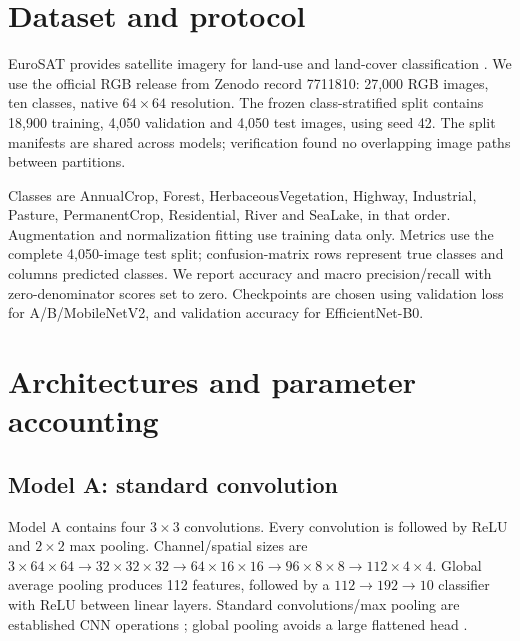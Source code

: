 \documentclass[11pt,a4paper]{article}
\begin{document}
\section{Dataset and protocol}
EuroSAT provides satellite imagery for land-use and land-cover classification \cite{helber}. We use the official RGB release from Zenodo record 7711810: 27,000 RGB images, ten classes, native $64\times64$ resolution. The frozen class-stratified split contains 18,900 training, 4,050 validation and 4,050 test images, using seed 42. The split manifests are shared across models; verification found no overlapping image paths between partitions.

Classes are AnnualCrop, Forest, HerbaceousVegetation, Highway, Industrial, Pasture, PermanentCrop, Residential, River and SeaLake, in that order. Augmentation and normalization fitting use training data only. Metrics use the complete 4,050-image test split; confusion-matrix rows represent true classes and columns predicted classes. We report accuracy and macro precision/recall with zero-denominator scores set to zero. Checkpoints are chosen using validation loss for A/B/MobileNetV2, and validation accuracy for EfficientNet-B0.

\section{Architectures and parameter accounting}
\subsection{Model A: standard convolution}
Model A contains four $3\times3$ convolutions. Every convolution is followed by ReLU and $2\times2$ max pooling. Channel/spatial sizes are
$3\times64\times64\rightarrow32\times32\times32\rightarrow64\times16\times16\rightarrow96\times8\times8\rightarrow112\times4\times4$.
Global average pooling produces 112 features, followed by a $112\rightarrow192\rightarrow10$ classifier with ReLU between linear layers. Standard convolutions/max pooling are established CNN operations \cite{alexnet}; global pooling avoids a large flattened head \cite{nin}.
\end{document}
